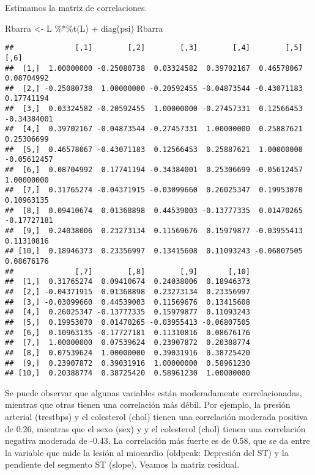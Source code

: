 \documentclass[
]{article}
\newenvironment{Shaded}{\begin{snugshade}}{\end{snugshade}}
\newcommand{\FunctionTok}[1]{\textcolor[rgb]{0.00,0.00,0.00}{#1}}
\newcommand{\NormalTok}[1]{#1}
\newcommand{\OtherTok}[1]{\textcolor[rgb]{0.56,0.35,0.01}{#1}}
\newcommand{\SpecialCharTok}[1]{\textcolor[rgb]{0.00,0.00,0.00}{#1}}
\begin{document}
Estimamos la matriz de correlaciones.

\begin{Shaded}
\begin{Highlighting}[]
\NormalTok{Rbarra }\OtherTok{\textless{}{-}}\NormalTok{ L }\SpecialCharTok{\%*\%}\FunctionTok{t}\NormalTok{(L) }\SpecialCharTok{+} \FunctionTok{diag}\NormalTok{(psi)}
\NormalTok{Rbarra}
\end{Highlighting}
\end{Shaded}

\begin{verbatim}
##              [,1]        [,2]        [,3]        [,4]        [,5]        [,6]
##  [1,]  1.00000000 -0.25080738  0.03324582  0.39702167  0.46578067  0.08704992
##  [2,] -0.25080738  1.00000000 -0.20592455 -0.04873544 -0.43071183  0.17741194
##  [3,]  0.03324582 -0.20592455  1.00000000 -0.27457331  0.12566453 -0.34384001
##  [4,]  0.39702167 -0.04873544 -0.27457331  1.00000000  0.25887621  0.25306699
##  [5,]  0.46578067 -0.43071183  0.12566453  0.25887621  1.00000000 -0.05612457
##  [6,]  0.08704992  0.17741194 -0.34384001  0.25306699 -0.05612457  1.00000000
##  [7,]  0.31765274 -0.04371915 -0.03099660  0.26025347  0.19953070  0.10963135
##  [8,]  0.09410674  0.01368898  0.44539003 -0.13777335  0.01470265 -0.17727181
##  [9,]  0.24038006  0.23273134  0.11569676  0.15979877 -0.03955413  0.11310816
## [10,]  0.18946373  0.23356997  0.13415608  0.11093243 -0.06807505  0.08676176
##              [,7]        [,8]        [,9]       [,10]
##  [1,]  0.31765274  0.09410674  0.24038006  0.18946373
##  [2,] -0.04371915  0.01368898  0.23273134  0.23356997
##  [3,] -0.03099660  0.44539003  0.11569676  0.13415608
##  [4,]  0.26025347 -0.13777335  0.15979877  0.11093243
##  [5,]  0.19953070  0.01470265 -0.03955413 -0.06807505
##  [6,]  0.10963135 -0.17727181  0.11310816  0.08676176
##  [7,]  1.00000000  0.07539624  0.23907872  0.20388774
##  [8,]  0.07539624  1.00000000  0.39031916  0.38725420
##  [9,]  0.23907872  0.39031916  1.00000000  0.58961230
## [10,]  0.20388774  0.38725420  0.58961230  1.00000000
\end{verbatim}

Se puede observar que algunas variables están moderadamente
correlacionadas, mientras que otras tienen una correlación más débil.
Por ejemplo, la presión arterial (trestbps) y el colesterol (chol)
tienen una correlación moderada positiva de 0.26, mientras que el sexo
(sex) y y el colesterol (chol) tienen una correlación negativa moderada
de -0.43. La correlación más fuerte es de 0.58, que se da entre la
variable que mide la lesión al miocardio (oldpeak: Depresión del ST) y
la pendiente del segmento ST (slope). Veamos la matriz residual.
\end{document}
